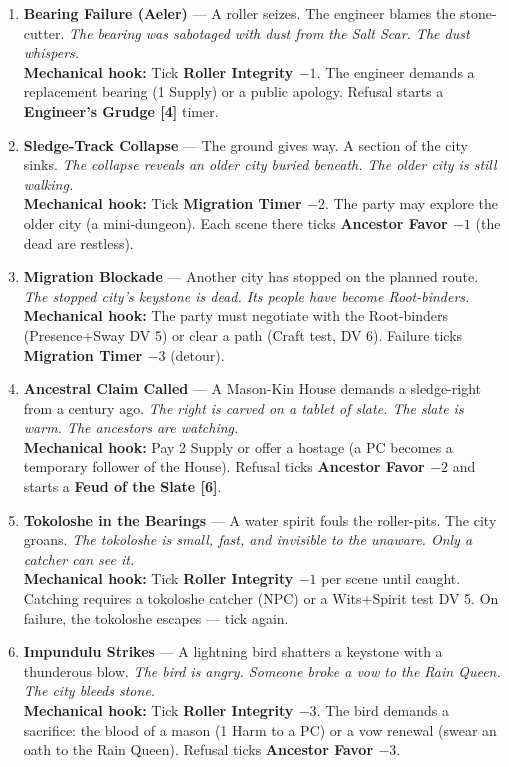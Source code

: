\begin{enumerate}
\item \textbf{Bearing Failure (Aeler)} --- A roller seizes. The engineer blames the stone-cutter.
  \hfill \textit{The bearing was sabotaged with dust from the Salt Scar. The dust whispers.} \\
  \textbf{Mechanical hook:} Tick \textbf{Roller Integrity $-1$}. The engineer demands a replacement bearing (1 Supply) or a public apology. Refusal starts a \textbf{Engineer's Grudge [4]} timer.

\item \textbf{Sledge-Track Collapse} --- The ground gives way. A section of the city sinks.
  \hfill \textit{The collapse reveals an older city buried beneath. The older city is still walking.} \\
  \textbf{Mechanical hook:} Tick \textbf{Migration Timer $-2$}. The party may explore the older city (a mini-dungeon). Each scene there ticks \textbf{Ancestor Favor $-1$} (the dead are restless).

\item \textbf{Migration Blockade} --- Another city has stopped on the planned route.
  \hfill \textit{The stopped city's keystone is dead. Its people have become Root-binders.} \\
  \textbf{Mechanical hook:} The party must negotiate with the Root-binders (Presence+Sway DV 5) or clear a path (Craft test, DV 6). Failure ticks \textbf{Migration Timer $-3$} (detour).

\item \textbf{Ancestral Claim Called} --- A Mason-Kin House demands a sledge-right from a century ago.
  \hfill \textit{The right is carved on a tablet of slate. The slate is warm. The ancestors are watching.} \\
  \textbf{Mechanical hook:} Pay 2 Supply or offer a hostage (a PC becomes a temporary follower of the House). Refusal ticks \textbf{Ancestor Favor $-2$} and starts a \textbf{Feud of the Slate [6]}.

\item[J] \textbf{Tokoloshe in the Bearings} --- A water spirit fouls the roller-pits. The city groans.
  \hfill \textit{The tokoloshe is small, fast, and invisible to the unaware. Only a catcher can see it.} \\
  \textbf{Mechanical hook:} Tick \textbf{Roller Integrity $-1$} per scene until caught. Catching requires a tokoloshe catcher (NPC) or a Wits+Spirit test DV 5. On failure, the tokoloshe escapes --- tick again.

\item[Q] \textbf{Impundulu Strikes} --- A lightning bird shatters a keystone with a thunderous blow.
  \hfill \textit{The bird is angry. Someone broke a vow to the Rain Queen. The city bleeds stone.} \\
  \textbf{Mechanical hook:} Tick \textbf{Roller Integrity $-3$}. The bird demands a sacrifice: the blood of a mason (1 Harm to a PC) or a vow renewal (swear an oath to the Rain Queen). Refusal ticks \textbf{Ancestor Favor $-3$}.


\end{enumerate}
